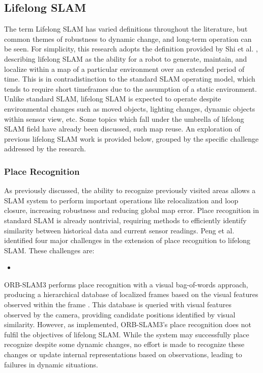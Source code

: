 \subsection{Lifelong SLAM}

The term Lifelong SLAM has varied definitions throughout the literature, but common themes of robustness to dynamic change, and long-term operation can be seen. For simplicity, this research adopts the definition provided by Shi et al. \cite{shiAreWeReady2020}, describing lifelong SLAM as the ability for a robot to generate, maintain, and localize within a map of a particular environment over an extended period of time. This is in contradistinction to the standard SLAM operating model, which tends to require short timeframes due to the assumption of a static environment. Unlike standard SLAM, lifelong SLAM is expected to operate despite environmental changes such as moved objects, lighting changes, dynamic objects within sensor view, etc. Some topics which fall under the umbrella of lifelong SLAM field have already been discussed, such map reuse. An exploration of previous lifelong SLAM work is provided below, grouped by the specific challenge addressed by the research.

\subsubsection{Place Recognition}

As previously discussed, the ability to recognize previously visited areas allows a SLAM system to perform important operations like relocalization and loop closure, increasing robustness and reducing global map error. Place recognition in standard SLAM is already nontrivial, requiring methods to efficiently identify similarity between historical data and current sensor readings. Peng et al. identified four major challenges in the extension of place recognition to lifelong SLAM. These challenges are:
\begin{itemize}
    \item 
\end{itemize}

ORB-SLAM3 performs place recognition with a visual bag-of-words approach, producing a hierarchical database of localized frames based on the visual features observed within the frame \cite{camposORBSLAM3AccurateOpenSource2021}\cite{galvez-lopezBagsBinaryWords2012}. This database is queried with visual features observed by the camera, providing candidate positions identified by visual similarity. However, as implemented, ORB-SLAM3's place recognition does not fulfil the objectives of lifelong SLAM. While the system may successfully place recognize despite some dynamic changes, no effort is made to recognize these changes or update internal representations based on observations, leading to failures in dynamic situations.




